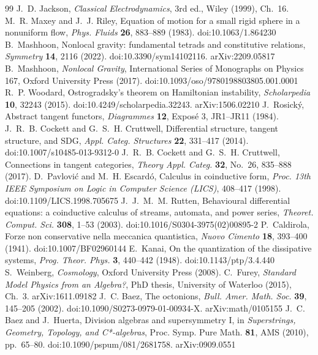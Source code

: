 \documentclass[10pt]{article}
\begin{document}
\begin{thebibliography}{99}\footnotesize\itemsep-0.8pt\setlength{\parskip}{0pt}
 J.~D. Jackson, \textit{Classical Electrodynamics}, 3rd ed., Wiley (1999), Ch.~16.
 M.~R. Maxey and J.~J. Riley, Equation of motion for a small rigid sphere in a nonuniform flow, \textit{Phys. Fluids} \textbf{26}, 883--889 (1983). doi:10.1063/1.864230
 B.~Mashhoon, Nonlocal gravity: fundamental tetrads and constitutive relations, \textit{Symmetry} \textbf{14}, 2116 (2022). doi:10.3390/sym14102116. arXiv:2209.05817
 B.~Mashhoon, \textit{Nonlocal Gravity}, International Series of Monographs on Physics 167, Oxford University Press (2017). doi:10.1093/oso/9780198803805.001.0001
 R.~P. Woodard, Ostrogradsky's theorem on Hamiltonian instability, \textit{Scholarpedia} \textbf{10}, 32243 (2015). doi:10.4249/scholarpedia.32243. arXiv:1506.02210
 J.~Rosick\'y, Abstract tangent functors, \textit{Diagrammes} \textbf{12}, Expos\'e 3, JR1--JR11 (1984).
 J.~R.~B. Cockett and G.~S.~H. Cruttwell, Differential structure, tangent structure, and SDG, \textit{Appl. Categ. Structures} \textbf{22}, 331--417 (2014). doi:10.1007/s10485-013-9312-0
 J.~R.~B. Cockett and G.~S.~H. Cruttwell, Connections in tangent categories, \textit{Theory Appl. Categ.} \textbf{32}, No.~26, 835--888 (2017).
 D.~Pavlovi\'c and M.~H. Escard\'o, Calculus in coinductive form, \textit{Proc. 13th IEEE Symposium on Logic in Computer Science (LICS)}, 408--417 (1998). doi:10.1109/LICS.1998.705675
 J.~J.~M.~M. Rutten, Behavioural differential equations: a coinductive calculus of streams, automata, and power series, \textit{Theoret. Comput. Sci.} \textbf{308}, 1--53 (2003). doi:10.1016/S0304-3975(02)00895-2
 P.~Caldirola, Forze non conservative nella meccanica quantistica, \textit{Nuovo Cimento} \textbf{18}, 393--400 (1941). doi:10.1007/BF02960144
 E.~Kanai, On the quantization of the dissipative systems, \textit{Prog. Theor. Phys.} \textbf{3}, 440--442 (1948). doi:10.1143/ptp/3.4.440
 S.~Weinberg, \textit{Cosmology}, Oxford University Press (2008).
 C.~Furey, \textit{Standard Model Physics from an Algebra?}, PhD thesis, University of Waterloo (2015), Ch.~3. arXiv:1611.09182
 J.~C. Baez, The octonions, \textit{Bull. Amer. Math. Soc.} \textbf{39}, 145--205 (2002). doi:10.1090/S0273-0979-01-00934-X. arXiv:math/0105155
 J.~C. Baez and J.~Huerta, Division algebras and supersymmetry I, in \textit{Superstrings, Geometry, Topology, and C*-algebras}, Proc. Symp. Pure Math. \textbf{81}, AMS (2010), pp.~65--80. doi:10.1090/pspum/081/2681758. arXiv:0909.0551

\end{thebibliography}
\end{document}
